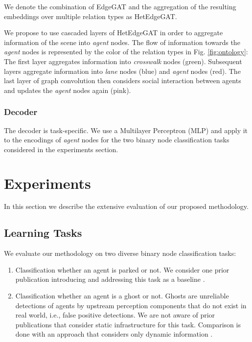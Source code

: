 \documentclass[letterpaper, 10 pt, journal, twoside]{IEEEtran}
\begin{document}
We denote the combination of EdgeGAT and the aggregation of the resulting embeddings over multiple relation types as HetEdgeGAT.

We propose to use cascaded layers of HetEdgeGAT in order to aggregate information of the scene into \textit{agent} nodes.
The flow of information towards the \textit{agent} nodes is represented by the color of the relation types in Fig. \ref{fig:ontology}:
The first layer aggregates information into \textit{crosswalk} nodes (green).
Subsequent layers aggregate information into \textit{lane} nodes (blue) and \textit{agent} nodes (red).
The last layer of graph convolution then considers social interaction between agents and updates the \textit{agent} nodes again (pink).

\subsubsection{Decoder}
The decoder is task-specific.
We use a Multilayer Perceptron (MLP) and apply it to the encodings of \textit{agent} nodes for the two binary node classification tasks considered in the experiments section.


\section{Experiments} \label{sec:experiments}
In this section we describe the extensive evaluation of our proposed methodology.

\subsection{Learning Tasks}
We evaluate our methodology on two diverse binary node classification tasks:
\begin{enumerate}
	\item Classification whether an agent is parked or not. We consider one prior publication introducing and addressing this task as a baseline \cite{Behrendt2019}.
	\item Classification whether an agent is a ghost or not. Ghosts are unreliable detections of agents by upstream perception components that do not exist in real world, i.e., false positive detections. We are not aware of prior publications that consider static infrastructure for this task. Comparison is done with an approach that considers only dynamic information \cite{Aeberhard2011}.
\end{enumerate}
\end{document}
